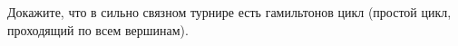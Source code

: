 Докажите, что в сильно связном турнире есть гамильтонов цикл (простой цикл, проходящий по всем вершинам).
